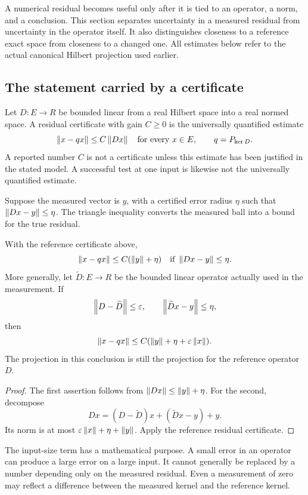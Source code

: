 \label{sec:certificate-reading}
A numerical residual becomes useful only after it is tied to an operator, a norm, and a conclusion. This section separates uncertainty in a measured residual from uncertainty in the operator itself. It also distinguishes closeness to a reference exact space from closeness to a changed one. All estimates below refer to the actual canonical Hilbert projection used earlier.

\subsection{The statement carried by a certificate}
Let \(D:E\to R\) be bounded linear from a real Hilbert space into a real normed space. A residual certificate with gain \(C\ge0\) is the universally quantified estimate
\[
 \left\lVert x-qx\right\rVert\le C\left\lVert Dx\right\rVert\quad\text{for every }x\in E,
 \qquad q=P_{\ker D}.
\]
A reported number \(C\) is not a certificate unless this estimate has been justified in the stated model. A successful test at one input is likewise not the universally quantified estimate.

Suppose the measured vector is \(y\), with a certified error radius \(\eta\) such that \(\left\lVert Dx-y\right\rVert\le\eta\). The triangle inequality converts the measured ball into a bound for the true residual.

\begin{proposition}\label{KS69}
With the reference certificate above,
\[
 \left\lVert x-qx\right\rVert\le C(\left\lVert y\right\rVert+\eta)
 \quad\text{if }\left\lVert Dx-y\right\rVert\le\eta.
\]
More generally, let \(\widetilde D:E\to R\) be the bounded linear operator actually used in the measurement. If
\[
 \left\lVert D-\widetilde D\right\rVert\le\varepsilon,
 \qquad\left\lVert\widetilde D x-y\right\rVert\le\eta,
\]
then
\begin{equation}\label{eq:measured-reference}
 \left\lVert x-qx\right\rVert\le C(\left\lVert y\right\rVert+\eta+\varepsilon\left\lVert x\right\rVert).
\end{equation}
The projection in this conclusion is still the projection for the reference operator \(D\).
\end{proposition}
\begin{proof}
The first assertion follows from \(\left\lVert Dx\right\rVert\le\left\lVert y\right\rVert+\eta\). For the second, decompose
\[
 Dx=(D-\widetilde D)x+(\widetilde D x-y)+y.
\]
Its norm is at most \(\varepsilon\left\lVert x\right\rVert+\eta+\left\lVert y\right\rVert\). Apply the reference residual certificate.
\end{proof}
The input-size term has a mathematical purpose. A small error in an operator can produce a large error on a large input. It cannot generally be replaced by a number depending only on the measured residual. Even a measurement of zero may reflect a difference between the measured kernel and the reference kernel.

